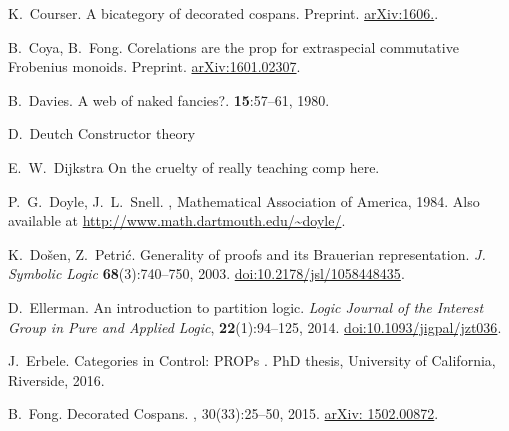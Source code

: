\begin{thebibliography}{RSW00}
    K.\ Courser.
    \newblock A bicategory of decorated cospans.
    \newblock Preprint. 
    \newblock \href{http://arxiv.org/abs/1606.}{arXiv:1606.}.

    B.\ Coya, B.\ Fong.
    \newblock Corelations are the prop for extraspecial commutative Frobenius
    monoids.
    \newblock Preprint.
    \newblock \href{http://arxiv.org/abs/1601.02307}{arXiv:1601.02307}.

    B.\ Davies.
    \newblock A web of naked fancies?.
     {\bf 15}:57--61, 1980.

    D.\ Deutch
    \newblock Constructor theory
    
    E.\ W.\ Dijkstra
    \newblock On the cruelty of really teaching comp
    \newblock here.


    P.\ G.\ Doyle, J.\ L.\ Snell.
    , Mathematical Association of America, 1984.
    \newblock Also available at \href{http://www.math.dartmouth.edu/~doyle/}
    {http://www.math.dartmouth.edu/\~{}doyle/}.

    K.\ Do\v{s}en, Z.\ Petri\'c.
    \newblock Generality of proofs and its Brauerian representation.
    \newblock \textsl{J. Symbolic Logic} {\bf 68}(3):740--750, 2003.
    \newblock
    \href{http://doi.org/10.2178/jsl/1058448435}{doi:10.2178/jsl/1058448435}.

  D.\ Ellerman.
  \newblock An introduction to partition logic.
  \newblock \textsl{Logic Journal of the Interest Group in Pure and Applied
  Logic}, {\bf 22}(1):94--125, 2014.
  \newblock
  \href{http://doi.org/10.1093/jigpal/jzt036}{doi:10.1093/jigpal/jzt036}.
    
    J.\ Erbele.
    \newblock Categories in Control: PROPs .
    \newblock PhD thesis, University of California, Riverside, 2016. 

    B.\ Fong.
    \newblock Decorated Cospans.
    , 30(33):25--50, 2015.
    \newblock \href{http://arxiv.org/abs/1502.00872}{arXiv: 1502.00872}.


\end{thebibliography}
